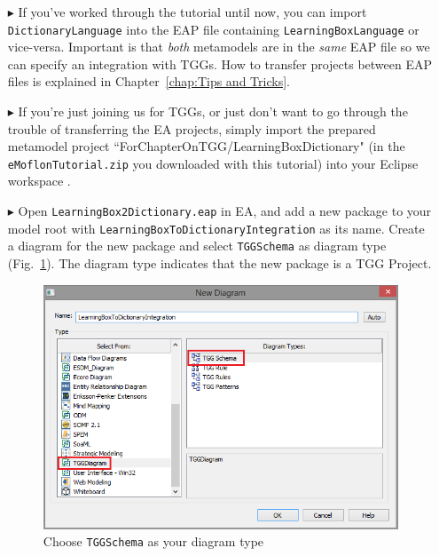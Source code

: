 \begin{enumerate}
\item[$\blacktriangleright$] If you've worked through the tutorial until now, you can import \texttt{Dic\-tion\-ary\-Language} into the EAP file containing \texttt{Learning\-Box\-Language} or vice-versa.
Important is that \emph{both} metamodels are in the \emph{same} EAP file so we can specify an integration with TGGs.
How to transfer projects between EAP files is explained in Chapter~\ref{chap:Tips and Tricks}.

\item[$\blacktriangleright$] If you're just joining us for TGGs, or just don't want to go through the trouble of transferring the EA projects, simply import the prepared metamodel project ``For\-Chapter\-On\-TGG/Learning\-Box\-Dic\-tion\-ary" (in the \texttt{eMoflon\-Tutorial.zip} you downloaded with this tutorial) into your Eclipse workspace .

\item[$\blacktriangleright$] Open \texttt{LearningBox2Dictionary.eap} in EA, and add a new package to your model root with \texttt{Learning\-Box\-To\-Dictionary\-Integration} as its name. 
Create a diagram for the new package and select \texttt{TGGSchema} as diagram type (Fig.~\ref{fig:tgg_diagram_type}). 
The diagram type indicates that the new package is a TGG Project. 

\begin{figure}[htbp]
\begin{center}
  \includegraphics[width=\textwidth]{pics/tggBilder/tggSchema/tgg1.png}
  \caption{Choose \texttt{TGGSchema} as your diagram type}  
  \label{fig:tgg_diagram_type}
\end{center}
\end{figure}


\end{enumerate}

